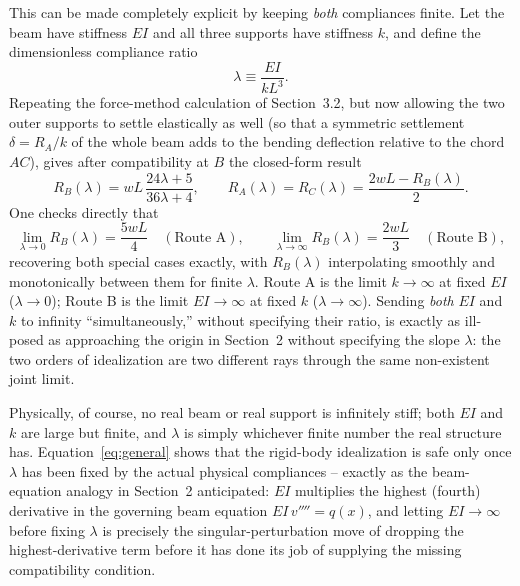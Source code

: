\documentclass[11pt]{article}
\begin{document}
This can be made completely explicit by keeping \emph{both} compliances finite. Let the beam have stiffness $EI$ and all three supports have stiffness $k$, and define the dimensionless compliance ratio
\begin{equation}
\lambda \equiv \frac{EI}{k L^3}.
\end{equation}
Repeating the force-method calculation of Section~3.2, but now allowing the two outer supports to settle elastically as well (so that a symmetric settlement $\delta=R_A/k$ of the whole beam adds to the bending deflection relative to the chord $AC$), gives after compatibility at $B$ the closed-form result
\begin{equation}
R_B(\lambda) = wL\,\frac{24\lambda+5}{36\lambda+4}, \qquad R_A(\lambda)=R_C(\lambda)=\frac{2wL-R_B(\lambda)}{2}.
\label{eq:general}
\end{equation}
One checks directly that
\begin{equation}
\lim_{\lambda\to0} R_B(\lambda) = \frac{5wL}{4} \quad(\text{Route A}), \qquad
\lim_{\lambda\to\infty} R_B(\lambda) = \frac{2wL}{3} \quad(\text{Route B}),
\end{equation}
recovering both special cases exactly, with $R_B(\lambda)$ interpolating smoothly and monotonically between them for finite $\lambda$. Route A is the limit $k\to\infty$ at fixed $EI$ ($\lambda\to0$); Route B is the limit $EI\to\infty$ at fixed $k$ ($\lambda\to\infty$). Sending \emph{both} $EI$ and $k$ to infinity ``simultaneously,'' without specifying their ratio, is exactly as ill-posed as approaching the origin in Section~2 without specifying the slope $\lambda$: the two orders of idealization are two different rays through the same non-existent joint limit.

Physically, of course, no real beam or real support is infinitely stiff; both $EI$ and $k$ are large but finite, and $\lambda$ is simply whichever finite number the real structure has. Equation~\eqref{eq:general} shows that the rigid-body idealization is safe only once $\lambda$ has been fixed by the actual physical compliances -- exactly as the beam-equation analogy in Section~2 anticipated: $EI$ multiplies the highest (fourth) derivative in the governing beam equation $EI\,v''''=q(x)$, and letting $EI\to\infty$ before fixing $\lambda$ is precisely the singular-perturbation move of dropping the highest-derivative term before it has done its job of supplying the missing compatibility condition.

\end{document}
